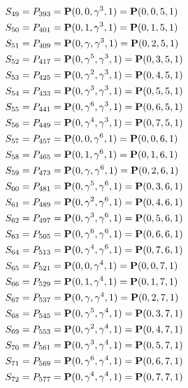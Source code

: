 \documentclass{article}
\newcommand{\bP}{{\bf P}}
\begin{document}
{\begin{align*}
S_{49} &= P_{393}=\bP(0, 0, \gamma^{3}, 1) = \bP(0, 0, 5, 1)\\
S_{50} &= P_{401}=\bP(0, 1, \gamma^{3}, 1) = \bP(0, 1, 5, 1)\\
S_{51} &= P_{409}=\bP(0, \gamma , \gamma^{3}, 1) = \bP(0, 2, 5, 1)\\
S_{52} &= P_{417}=\bP(0, \gamma^{5}, \gamma^{3}, 1) = \bP(0, 3, 5, 1)\\
S_{53} &= P_{425}=\bP(0, \gamma^{2}, \gamma^{3}, 1) = \bP(0, 4, 5, 1)\\
S_{54} &= P_{433}=\bP(0, \gamma^{3}, \gamma^{3}, 1) = \bP(0, 5, 5, 1)\\
S_{55} &= P_{441}=\bP(0, \gamma^{6}, \gamma^{3}, 1) = \bP(0, 6, 5, 1)\\
S_{56} &= P_{449}=\bP(0, \gamma^{4}, \gamma^{3}, 1) = \bP(0, 7, 5, 1)\\
S_{57} &= P_{457}=\bP(0, 0, \gamma^{6}, 1) = \bP(0, 0, 6, 1)\\
S_{58} &= P_{465}=\bP(0, 1, \gamma^{6}, 1) = \bP(0, 1, 6, 1)\\
S_{59} &= P_{473}=\bP(0, \gamma , \gamma^{6}, 1) = \bP(0, 2, 6, 1)\\
S_{60} &= P_{481}=\bP(0, \gamma^{5}, \gamma^{6}, 1) = \bP(0, 3, 6, 1)\\
S_{61} &= P_{489}=\bP(0, \gamma^{2}, \gamma^{6}, 1) = \bP(0, 4, 6, 1)\\
S_{62} &= P_{497}=\bP(0, \gamma^{3}, \gamma^{6}, 1) = \bP(0, 5, 6, 1)\\
S_{63} &= P_{505}=\bP(0, \gamma^{6}, \gamma^{6}, 1) = \bP(0, 6, 6, 1)\\
S_{64} &= P_{513}=\bP(0, \gamma^{4}, \gamma^{6}, 1) = \bP(0, 7, 6, 1)\\
S_{65} &= P_{521}=\bP(0, 0, \gamma^{4}, 1) = \bP(0, 0, 7, 1)\\
S_{66} &= P_{529}=\bP(0, 1, \gamma^{4}, 1) = \bP(0, 1, 7, 1)\\
S_{67} &= P_{537}=\bP(0, \gamma , \gamma^{4}, 1) = \bP(0, 2, 7, 1)\\
S_{68} &= P_{545}=\bP(0, \gamma^{5}, \gamma^{4}, 1) = \bP(0, 3, 7, 1)\\
S_{69} &= P_{553}=\bP(0, \gamma^{2}, \gamma^{4}, 1) = \bP(0, 4, 7, 1)\\
S_{70} &= P_{561}=\bP(0, \gamma^{3}, \gamma^{4}, 1) = \bP(0, 5, 7, 1)\\
S_{71} &= P_{569}=\bP(0, \gamma^{6}, \gamma^{4}, 1) = \bP(0, 6, 7, 1)\\
S_{72} &= P_{577}=\bP(0, \gamma^{4}, \gamma^{4}, 1) = \bP(0, 7, 7, 1)\\
\end{align*}
}
\end{document}
